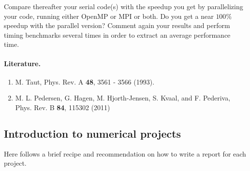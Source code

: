 \documentclass[%
oneside,                 %
final,                   %
10pt]{article}
\begin{document}
Compare thereafter your serial code(s)  with the speedup you get by parallelizing your code, running either OpenMP or MPI or both.
Do you get a near $100\%$ speedup with the parallel version? Comment again your results and perform timing benchmarks several times in order
to extract  an average performance time.



\paragraph{Literature.}
\begin{enumerate}
 \item M. Taut, Phys. Rev. A \textbf{48}, 3561 - 3566 (1993).

 \item M. L. Pedersen, G. Hagen, M. Hjorth-Jensen, S. Kvaal,  and F. Pederiva, Phys. Rev. B \textbf{84}, 115302 (2011)
\end{enumerate}

\noindent
\subsection*{Introduction to numerical projects}

Here follows a brief recipe and recommendation on how to write a report for each
project.
\end{document}
